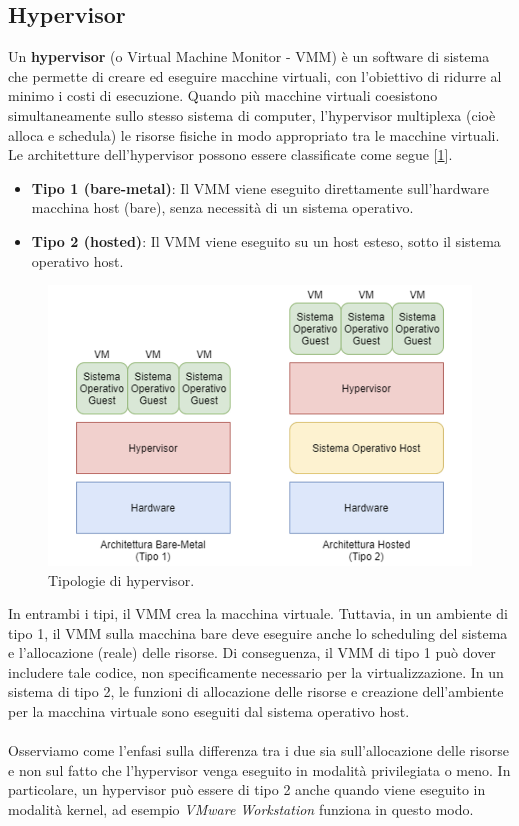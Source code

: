 \subsection{Hypervisor}
Un \textbf{hypervisor} (o Virtual Machine Monitor - VMM) è un software di sistema che permette di creare ed eseguire macchine virtuali, con l'obiettivo di ridurre al minimo i costi di esecuzione. Quando più macchine virtuali coesistono simultaneamente sullo stesso sistema di computer, l’hypervisor multiplexa (cioè alloca e
schedula) le risorse fisiche in modo appropriato tra le macchine virtuali. Le architetture dell’hypervisor possono essere classificate come segue [\ref{fig:hyper-type}].
\begin{itemize}
    \item \textbf{Tipo 1 (bare-metal)}: Il VMM viene eseguito direttamente sull'hardware macchina host (bare), senza necessità di un sistema operativo.
    \item \textbf{Tipo 2 (hosted)}: Il VMM viene eseguito su un host esteso, sotto il sistema operativo host.
\end{itemize}
\begin{figure}[!h]
    \centering
    \includegraphics[width=0.6\linewidth]{img/hyperv-types.png}
    \caption{Tipologie di hypervisor.}
    \label{fig:hyper-type}
\end{figure}
In entrambi i tipi, il VMM crea la macchina virtuale. Tuttavia, in un ambiente di tipo 1, il
VMM sulla macchina bare deve eseguire anche lo scheduling del sistema e l'allocazione (reale)
delle risorse. Di conseguenza, il VMM di tipo 1 può dover includere tale codice, non specificamente
necessario per la virtualizzazione. In un sistema di tipo 2, le funzioni di allocazione delle
risorse e creazione dell'ambiente per la macchina virtuale sono eseguiti dal sistema operativo host.
\\
\\
Osserviamo come l'enfasi sulla differenza tra i due sia sull'allocazione delle risorse e non sul fatto che l’hypervisor venga eseguito in modalità privilegiata o meno. In particolare, un hypervisor può essere di tipo 2 anche quando viene eseguito in modalità kernel, ad esempio \textit{VMware Workstation} funziona in questo modo.
